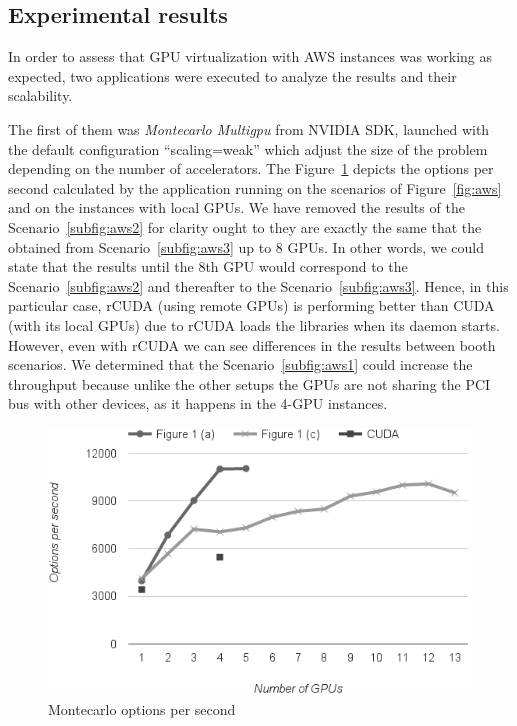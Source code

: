 \documentclass[a4paper,twoside]{article}
\begin{document}
\subsection{Experimental results}
In order to assess that GPU virtualization with AWS instances was working as expected, two applications were executed to analyze the results and their scalability.

The first of them was {\it Montecarlo Multigpu} from NVIDIA SDK, launched with the default configuration ``scaling=weak'' which adjust the size of the problem depending on the number of accelerators.
The Figure~\ref{fig:mont-opt} depicts the options per second calculated by the application running on the scenarios of Figure~\ref{fig:aws} and on the instances with local GPUs. 
We have removed the results of the Scenario~\ref{subfig:aws2} for clarity ought to they are exactly the same that the obtained from Scenario~\ref{subfig:aws3} up to 8 GPUs. 
In other words, we could state that the results until the 8th GPU would correspond to the Scenario~\ref{subfig:aws2} and thereafter to the Scenario~\ref{subfig:aws3}.
Hence, in this particular case, rCUDA (using remote GPUs) is performing better than CUDA (with its local GPUs) due to rCUDA loads the libraries when its daemon starts.
However, even with rCUDA we can see differences in the results between booth scenarios. We determined that the Scenario~\ref{subfig:aws1} could increase the throughput because
unlike the other setups the GPUs are not sharing the PCI bus with other devices, as it happens in the 4-GPU instances.
\begin{figure}[htb]
  \centering
  \includegraphics[width=\linewidth]{images/aws-mont1.png}
  \caption{Montecarlo options per second}
  \label{fig:mont-opt}
\end{figure}
\end{document}
